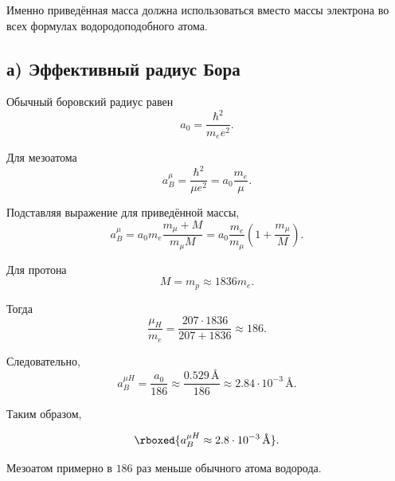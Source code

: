 \documentclass[../final.tex]{subfiles}
\begin{document}
Именно приведённая масса должна использоваться вместо массы электрона
во всех формулах водородоподобного атома.



\subsection*{а) Эффективный радиус Бора}

Обычный боровский радиус равен
%
\begin{equation*}
    a_0
    =
    \frac{\hbar^2}{m_e e^2}.
\end{equation*}

Для мезоатома
%
\begin{equation*}
    a_B^\mu
    =
    \frac{\hbar^2}{\mu e^2}
    =
    a_0\frac{m_e}{\mu}.
\end{equation*}

Подставляя выражение для приведённой массы,
%
\begin{equation*}
    a_B^\mu
    =
    a_0m_e
    \frac{m_\mu+M}{m_\mu M}
    =
    a_0
    \frac{m_e}{m_\mu}
    \left(
        1+\frac{m_\mu}{M}
    \right).
\end{equation*}

Для протона
%
\begin{equation*}
    M=m_p\approx1836m_e.
\end{equation*}

Тогда
%
\begin{equation*}
    \frac{\mu_H}{m_e}
    =
    \frac{207\cdot1836}{207+1836}
    \approx
    186.
\end{equation*}

Следовательно,
%
\begin{equation*}
    a_B^{\mu H}
    =
    \frac{a_0}{186}
    \approx
    \frac{0.529\,\text{\AA}}{186}
    \approx
    2.84\cdot10^{-3}\,\text{\AA}.
\end{equation*}

Таким образом,

\[
    \rboxed{
        a_B^{\mu H}
        \approx
        2.8\cdot10^{-3}\,\text{\AA}
    }.
\]

Мезоатом примерно в $186$ раз меньше обычного атома водорода.


\end{document}
